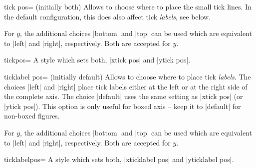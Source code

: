\begin{pgfplotsxykey}{\x tick pos= (initially both)}
Allows to choose where to place the small tick lines. In the default configuration, this does also affect tick \emph{labels}, see below.

For $y$, the additional choices |bottom| and |top| can be used which are equivalent to |left| and |right|, respectively. Both are accepted for $y$.
\end{pgfplotsxykey}

\begin{pgfplotskey}{tickpos=}
	A style which sets both, |xtick pos| and |ytick pos|.
\end{pgfplotskey}

\begin{pgfplotsxykey}{\x ticklabel pos= (initially default)}
Allows to choose where to place tick \emph{labels}. The choices |left| and |right| place tick labels either at the left or at the right side of the complete axis. The choice |default| uses the same setting as |xtick pos| (or |ytick pos|). This option is only useful for boxed axis -- keep it to |default| for non-boxed figures.

For $y$, the additional choices |bottom| and |top| can be used which are equivalent to |left| and |right|, respectively. Both are accepted for $y$.
\end{pgfplotsxykey}

\begin{pgfplotskey}{ticklabelpos=}
	A style which sets both, |xticklabel pos| and |yticklabel pos|.
\end{pgfplotskey}

